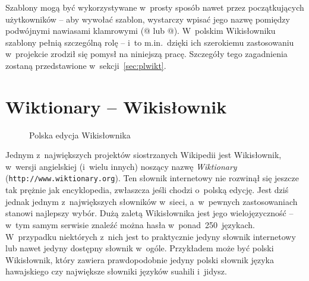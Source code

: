 \documentclass{pracamgr}
\newenvironment{illustration}[0]{
	\begin{figure}[ht]
	\begin{center}
}{
	\end{center}
	\end{figure}
}
\begin{document}
Szablony mogą być wykorzystywane w~prosty sposób nawet przez początkujących użytkowników -- aby wywołać szablon, wystarczy wpisać jego nazwę
 pomiędzy podwójnymi nawiasami klamrowymi (@ lub @). W~polskim Wikisłowniku szablony pełnią szczególną rolę -- i~to m.in.\ dzięki ich szerokiemu zastosowaniu w~projekcie zrodził się pomysł na niniejszą pracę. Szczegóły tego zagadnienia zostaną przedstawione w~sekcji~\ref{sec:plwikt}.

\section{Wiktionary -- Wikisłownik}
\begin{illustration}
	\caption{Polska edycja Wikisłownika}
\end{illustration}
Jednym z~największych projektów siostrzanych Wikipedii jest Wikisłownik, w~wersji angielskiej (i~wielu innych) noszący nazwę \emph{Wiktionary} (\texttt{http://www.wiktionary.org}). Ten słownik internetowy nie rozwinął się jeszcze tak prężnie jak encyklopedia, zwłaszcza jeśli chodzi o~polską edycję. Jest dziś jednak jednym z~największych słowników w~sieci, a~w~pewnych zastosowaniach stanowi najlepszy wybór. Dużą zaletą Wikisłownika jest jego wielojęzyczność -- w~tym samym serwisie znaleźć można hasła w~ponad~250~językach. W~przypadku niektórych z~nich jest to praktycznie jedyny słownik internetowy lub nawet jedyny dostępny słownik w~ogóle. Przykładem może być polski Wikisłownik, który zawiera prawdopodobnie jedyny polski słownik języka hawajskiego czy największe słowniki języków suahili i~jidysz. %
\end{document}
